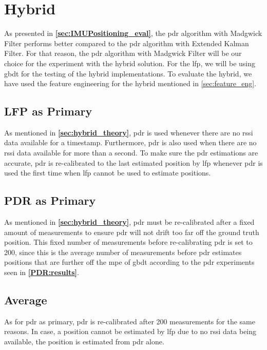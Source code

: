 \section{Hybrid}
As presented in \textbf{\autoref{sec:IMUPositioning_eval}}, the \gls{pdr} algorithm with Madgwick Filter performs better compared to the \gls{pdr} algorithm with Extended Kalman Filter. For that reason, the \gls{pdr} algorithm with Madgwick Filter will be our choice for the experiment with the hybrid solution. For the \gls{lfp}, we will be using \gls{gbdt} for the testing of the hybrid implementations.
To evaluate the hybrid, we have used the feature engineering for the hybrid mentioned in \autoref{sec:feature_eng}.

\subsection*{LFP as Primary}
As mentioned in \textbf{\autoref{sec:hybrid_theory}}, \gls{pdr} is used whenever there are no \gls{rssi} data available for a timestamp. Furthermore, \gls{pdr} is also used when there are no \gls{rssi} data available for more than a second. To make sure the \gls{pdr} estimations are accurate, \gls{pdr} is re-calibrated to the last estimated position by \gls{lfp} whenever \gls{pdr} is used the first time when \gls{lfp} cannot be used to estimate positions.

\subsection*{PDR as Primary}
As mentioned in \textbf{\autoref{sec:hybrid_theory}}, \gls{pdr} must be re-calibrated after a fixed amount of measurements to ensure \gls{pdr} will not drift too far off the ground truth position. This fixed number of measurements before re-calibrating \gls{pdr} is set to 200, since this is the average number of measurements before \gls{pdr} estimates positions that are further off the \gls{mpe} of \gls{gbdt} according to the \gls{pdr} experiments seen in \textbf{\autoref{PDR:results}}.

\subsection*{Average}
As for \gls{pdr} as primary, \gls{pdr} is re-calibrated after 200 measurements for the same reasons. In case, a position cannot be estimated by \gls{lfp} due to no \gls{rssi} data being available, the position is estimated from \gls{pdr} alone.